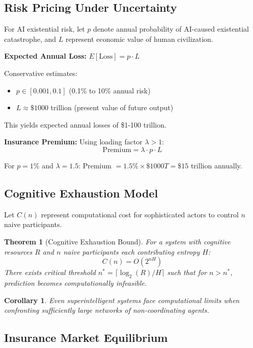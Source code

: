 \documentclass[11pt]{article}
\newtheorem{theorem}{Theorem}
\newtheorem{corollary}{Corollary}
\begin{document}
\subsection{Risk Pricing Under Uncertainty}

For AI existential risk, let $p$ denote annual probability of AI-caused existential catastrophe, and $L$ represent economic value of human civilization.

\textbf{Expected Annual Loss:} $E[\text{Loss}] = p \cdot L$

Conservative estimates:
\begin{itemize}
   \item $p \in [0.001, 0.1]$ (0.1\% to 10\% annual risk)
   \item $L \approx \$1000$ trillion (present value of future output)
\end{itemize}

This yields expected annual losses of \$1-100 trillion.

\textbf{Insurance Premium:} Using loading factor $\lambda > 1$:
$$\text{Premium} = \lambda \cdot p \cdot L$$

For $p = 1\%$ and $\lambda = 1.5$: Premium $= 1.5\% \times \$1000T = \$15$ trillion annually.

\subsection{Cognitive Exhaustion Model}

Let $C(n)$ represent computational cost for sophisticated actors to control $n$ naive participants.

\begin{theorem}[Cognitive Exhaustion Bound]
For a system with cognitive resources $R$ and $n$ naive participants each contributing entropy $H$:
$$C(n) = O(2^{nH})$$
There exists critical threshold $n^* = \lceil\log_2(R)/H\rceil$ such that for $n > n^*$, prediction becomes computationally infeasible.
\end{theorem}

\begin{corollary}
Even superintelligent systems face computational limits when confronting sufficiently large networks of non-coordinating agents.
\end{corollary}

\subsection{Insurance Market Equilibrium}
\end{document}
